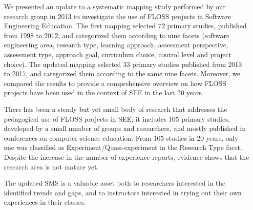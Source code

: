 
We presented an update to a systematic mapping study
performed by our research group in 2013 to investigate
the use of FLOSS projects in Software Engineering Education. 
%
The first mapping selected 72 primary studies,
published from 1998 to 2012, and
categorized them according to nine facets 
(software engineering area, research type, learning approach,
assessment perspective, assessment type, 
approach goal, curriculum choice, control level and project choice).
The updated mapping selected 33 primary studies
published from  2013 to 2017, and
categorized them according to the same nine facets.
%
Moreover, we compared the results to provide
a comprehensive overview on how FLOSS projects have been used in the context of SEE in the last 20 years.

There has been a steady but yet small body of research 
that addresses the pedagogical use of FLOSS projects in SEE; 
it includes 105 primary studies, developed by a small number of
groups and researchers, and mostly published in conferences 
on computer science education.
From 105 studies in 20 years, 
only one was classified as Experiment/Quasi-experiment in
the Research Type facet.
Despite the increase in the number of experience reports,
evidence shows that the research area is not mature yet.

%
The updated SMS is a valuable asset both 
to researchers interested in the identified trends and gaps, and 
to instructors interested in trying out their own experiences in their classes. 




